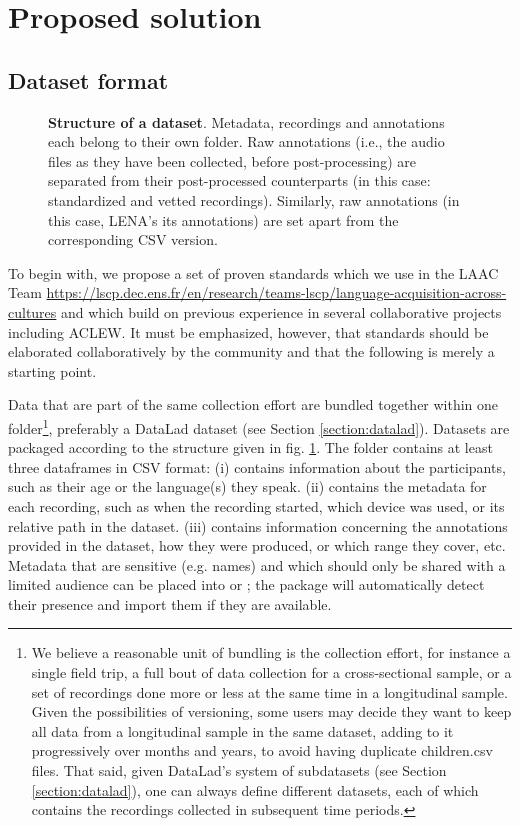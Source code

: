 \documentclass[smallextended]{svjour3}       %
\newcommand{\inputTikZ}[2]{%
     \scalebox{#1}{}
}
\begin{document}
\section{Proposed solution}


\subsection{\label{sec:format}Dataset format}

\begin{figure}[ht]
    \centering
    \inputTikZ{0.8}{Fig4.tex}
    \caption{\textbf{Structure of a dataset}. Metadata, recordings and annotations each belong to their own folder. Raw annotations (i.e., the audio files as they have been collected, before post-processing) are separated from their post-processed counterparts (in this case: standardized and vetted recordings). Similarly, raw annotations (in this case, LENA's its annotations) are set apart from the corresponding CSV version.}
    \label{fig:tree}
\end{figure}

To begin with, we propose a set of proven standards which we use in the LAAC Team \url{https://lscp.dec.ens.fr/en/research/teams-lscp/language-acquisition-across-cultures} and which build on previous experience in several collaborative projects including ACLEW. It must be emphasized, however, that standards should be elaborated collaboratively by the community and that the following is merely a starting point.

Data that are part of the same collection effort are bundled together within one folder\footnote{We believe a reasonable unit of bundling is the collection effort, for instance a single field trip,  a full bout of data collection for a cross-sectional sample, or a set of recordings done more or less at the same time in a longitudinal sample. Given the possibilities of versioning, some users may decide they want to keep all data from a longitudinal sample in the same dataset, adding to it progressively over months and years, to avoid having duplicate children.csv files. That said, given DataLad's system of subdatasets (see Section \ref{section:datalad}), one can always define different datasets, each of which contains the recordings collected in subsequent time periods.}, preferably a DataLad dataset (see Section \ref{section:datalad}). Datasets are packaged according to the structure given in fig. \ref{fig:tree}. The  folder contains at least three dataframes in CSV format: (i)  contains information about the participants, such as their age or the language(s) they speak. (ii)  contains the metadata for each recording, such as when the recording started, which device was used, or its relative path in the dataset. (iii)  contains information concerning the annotations provided in the dataset, how they were produced, or which range they cover, etc. Metadata that are sensitive (e.g. names) and which should only be shared with a limited audience can be placed into  or ; the package will automatically detect their presence and import them if they are available.
\end{document}
